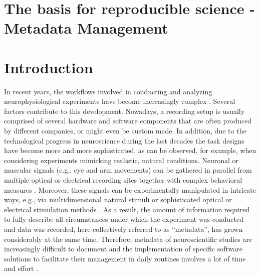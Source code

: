 \clearpage
\section{The basis for reproducible science - Metadata Management}
\label{sec:metadata}



\section{Introduction}
\label{sec:Introduction}

In recent years, the workflows involved in conducting and analyzing neurophysiological experiments have become increasingly complex \citep[e.g.][]{Coles_2008, Denker_2016, Brochier_2018}. Several factors contribute to this development. Nowadays, a recording setup is usually comprised of several hardware and software components that are often produced by different companies, or might even be custom made. In addition, due to the technological progress in neuroscience during the last decades the task designs have become more and more sophisticated, as can be observed, for example, when considering experiments mimicking realistic, natural conditions. Neuronal or muscular signals (e.g., eye and arm movements) can be gathered in parallel from multiple optical or electrical recording sites \citep{Nicolelis_2002,Verkhratsky_2006,Obien_2014} together with complex behavioral measures \citep{Jacob10_65,Maldonado_2008,Vargas-Irwin_2010,Schwarz_2014}. Moreover, these signals can be experimentally manipulated in intricate ways, e.g., via multidimensional natural stimuli \citep{Geisler_2008} or sophisticated optical or electrical stimulation methods \citep{Deisseroth_2013,Miyamoto_2015}. As a result, the amount of information required to fully describe all circumstances under which the experiment was conducted and data was recorded, here collectively referred to as ``metadata'', has grown considerably at the same time. Therefore, metadata of neuroscientific studies are increasingly difficult to document and the implementation of specific software solutions to facilitate their management in daily routines involves a lot of time and effort \citep{Zehl_2016}.


